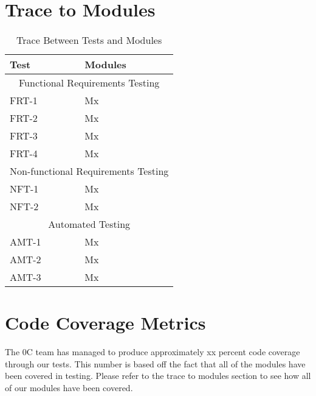 \documentclass[12pt, titlepage]{article}
\begin{document}
\section{Trace to Modules}		
\begin{table}[!htbp]
	\begin{tabular}{ll}
		\toprule
		Test & Modules \\
		\midrule
		\multicolumn{2}{c}{Functional Requirements Testing} \\
		\midrule
		FRT-1 & Mx \\
		FRT-2 & Mx \\
		FRT-3 & Mx \\
		FRT-4 & Mx \\
		\midrule
		\multicolumn{2}{c}{Non-functional Requirements Testing} \\
		\midrule
		NFT-1 &  Mx \\
		NFT-2 &  Mx \\
		\midrule
		\multicolumn{2}{c}{Automated Testing} \\
		\midrule
		AMT-1 & Mx\\
		AMT-2 & Mx\\
		AMT-3 & Mx\\
		\bottomrule
	\end{tabular}
	\caption{Trace Between Tests and Modules}
	\makeatletter
	\def\rulecolor#1#{\CT@arc{#1}}
	\def\CT@arc#1#2{%
		\ifdim\baselineskip=\z@\noalign\fi
		{\gdef\CT@arc@{\color#1{#2}}}}
	\let\CT@arc@\relax
	\makeatother
	\label{Table}
\end{table}

\FloatBarrier
\section{Code Coverage Metrics}
	The 0C team has managed to produce approximately xx percent code coverage through our tests. This number is based off the fact that all of the modules have been covered in testing. Please refer to the trace to modules section to see how all of our modules have been covered.
	



\end{document}
